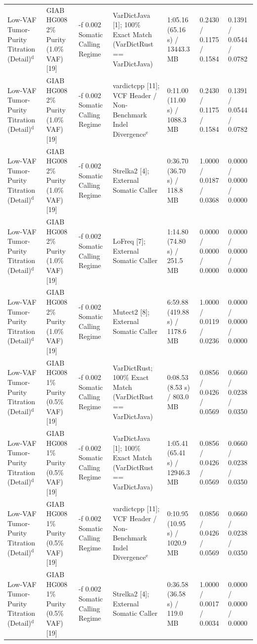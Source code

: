 \begin{table}[htbp]
{\begin{tabular}{lllllll}
Low-VAF Tumor-Purity Titration (Detail)$^{\text{d}}$ & GIAB HG008 2\% Purity (1.0\% VAF) [19] & -f 0.002 Somatic Calling Regime & VarDictJava [1]; 100\% Exact Match (VarDictRust == VarDictJava) & 1:05.16 (65.16 s) / 13443.3 MB & 0.2430 / 0.1175 / 0.1584 & 0.1391 / 0.0544 / 0.0782 \\
Low-VAF Tumor-Purity Titration (Detail)$^{\text{d}}$ & GIAB HG008 2\% Purity (1.0\% VAF) [19] & -f 0.002 Somatic Calling Regime & vardictcpp [11]; VCF Header / Non-Benchmark Indel Divergence$^{\text{e}}$ & 0:11.00 (11.00 s) / 1088.3 MB & 0.2430 / 0.1175 / 0.1584 & 0.1391 / 0.0544 / 0.0782 \\
Low-VAF Tumor-Purity Titration (Detail)$^{\text{d}}$ & GIAB HG008 2\% Purity (1.0\% VAF) [19] & -f 0.002 Somatic Calling Regime & Strelka2 [4]; External Somatic Caller & 0:36.70 (36.70 s) / 118.8 MB & 1.0000 / 0.0187 / 0.0368 & 0.0000 / 0.0000 / 0.0000 \\
Low-VAF Tumor-Purity Titration (Detail)$^{\text{d}}$ & GIAB HG008 2\% Purity (1.0\% VAF) [19] & -f 0.002 Somatic Calling Regime & LoFreq [7]; External Somatic Caller & 1:14.80 (74.80 s) / 251.5 MB & 0.0000 / 0.0000 / 0.0000 & 0.0000 / 0.0000 / 0.0000 \\
Low-VAF Tumor-Purity Titration (Detail)$^{\text{d}}$ & GIAB HG008 2\% Purity (1.0\% VAF) [19] & -f 0.002 Somatic Calling Regime & Mutect2 [8]; External Somatic Caller & 6:59.88 (419.88 s) / 1178.6 MB & 1.0000 / 0.0119 / 0.0236 & 0.0000 / 0.0000 / 0.0000 \\
Low-VAF Tumor-Purity Titration (Detail)$^{\text{d}}$ & GIAB HG008 1\% Purity (0.5\% VAF) [19] & -f 0.002 Somatic Calling Regime & VarDictRust; 100\% Exact Match (VarDictRust == VarDictJava) & 0:08.53 (8.53 s) / 803.0 MB & 0.0856 / 0.0426 / 0.0569 & 0.0660 / 0.0238 / 0.0350 \\
Low-VAF Tumor-Purity Titration (Detail)$^{\text{d}}$ & GIAB HG008 1\% Purity (0.5\% VAF) [19] & -f 0.002 Somatic Calling Regime & VarDictJava [1]; 100\% Exact Match (VarDictRust == VarDictJava) & 1:05.41 (65.41 s) / 12946.3 MB & 0.0856 / 0.0426 / 0.0569 & 0.0660 / 0.0238 / 0.0350 \\
Low-VAF Tumor-Purity Titration (Detail)$^{\text{d}}$ & GIAB HG008 1\% Purity (0.5\% VAF) [19] & -f 0.002 Somatic Calling Regime & vardictcpp [11]; VCF Header / Non-Benchmark Indel Divergence$^{\text{e}}$ & 0:10.95 (10.95 s) / 1020.9 MB & 0.0856 / 0.0426 / 0.0569 & 0.0660 / 0.0238 / 0.0350 \\
Low-VAF Tumor-Purity Titration (Detail)$^{\text{d}}$ & GIAB HG008 1\% Purity (0.5\% VAF) [19] & -f 0.002 Somatic Calling Regime & Strelka2 [4]; External Somatic Caller & 0:36.58 (36.58 s) / 119.0 MB & 1.0000 / 0.0017 / 0.0034 & 0.0000 / 0.0000 / 0.0000 \\

\end{tabular}}
\end{table}
